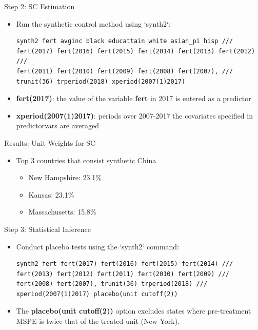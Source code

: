 \documentclass[hyperref={pdfpagelabels=false}]{beamer}
\begin{document}
\begin{frame}[fragile]{Step 2: SC Estimation}
\begin{itemize}
	\item Run the synthetic control method using `synth2`:
\begin{lstlisting}
synth2 fert avginc black educattain white asian_pi hisp ///
fert(2017) fert(2016) fert(2015) fert(2014) fert(2013) fert(2012) ///
fert(2011) fert(2010) fert(2009) fert(2008) fert(2007), ///
trunit(36) trperiod(2018) xperiod(2007(1)2017)
\end{lstlisting}
\vspace{0.2cm}
\item \textbf{fert(2017)}: the value of the variable \textbf{fert} in 2017 is entered as a predictor
\vspace{0.2cm}
\item \textbf{xperiod(2007(1)2017)}: periods over 2007-2017 the covariates specified in predictorvars are averaged
\end{itemize}
\end{frame}


\begin{frame}{Results: Unit Weights for SC}
\begin{itemize}
	\item Top 3 countries that consist synthetic China
	\begin{itemize}
		\vspace{0.2cm}
		\item New Hampshire: 23.1\%
		\vspace{0.2cm}
		\item Kansas: 23.1\%
		\vspace{0.2cm}
		\item Massachusetts: 15.8\%		
	\end{itemize}
	
	
\end{itemize}
\end{frame}


\begin{frame}[fragile]{Step 3: Statistical Inference}
\begin{itemize}
\item Conduct placebo tests using the `synth2` command:
\begin{lstlisting}
synth2 fert fert(2017) fert(2016) fert(2015) fert(2014) ///
fert(2013) fert(2012) fert(2011) fert(2010) fert(2009) ///
fert(2008) fert(2007), trunit(36) trperiod(2018) ///
xperiod(2007(1)2017) placebo(unit cutoff(2))
\end{lstlisting}
	\item The \textbf{placebo(unit cutoff(2))} option excludes states where pre-treatment MSPE is twice that of the treated unit (New York).
\end{itemize}
\end{frame}
\end{document}

